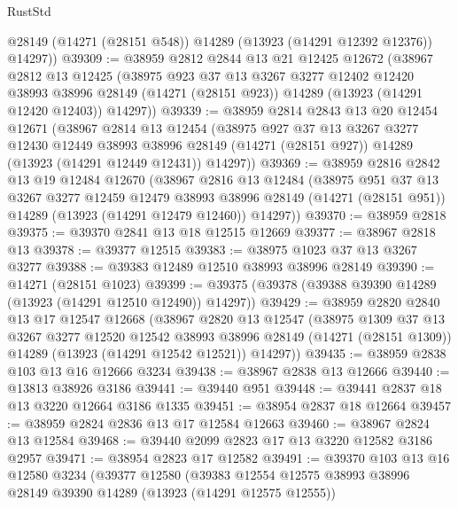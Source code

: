 \begin{lexlean}{RustStd}
\begin{coremodule}
        @28149
        (@14271 (@28151 @548))
        @14289
        (@13923 (@14291 @12392 @12376))
        @14297))
@39309 := @38959
    @2812
    @2844
    @13
    @21
    @12425
    @12672
    (@38967
      @2812
      @13
      @12425
      (@38975
        @923
        @37
        @13
        @3267
        @3277
        @12402
        @12420
        @38993
        @38996
        @28149
        (@14271 (@28151 @923))
        @14289
        (@13923 (@14291 @12420 @12403))
        @14297))
@39339 := @38959
    @2814
    @2843
    @13
    @20
    @12454
    @12671
    (@38967
      @2814
      @13
      @12454
      (@38975
        @927
        @37
        @13
        @3267
        @3277
        @12430
        @12449
        @38993
        @38996
        @28149
        (@14271 (@28151 @927))
        @14289
        (@13923 (@14291 @12449 @12431))
        @14297))
@39369 := @38959
    @2816
    @2842
    @13
    @19
    @12484
    @12670
    (@38967
      @2816
      @13
      @12484
      (@38975
        @951
        @37
        @13
        @3267
        @3277
        @12459
        @12479
        @38993
        @38996
        @28149
        (@14271 (@28151 @951))
        @14289
        (@13923 (@14291 @12479 @12460))
        @14297))
@39370 := @38959 @2818
@39375 := @39370 @2841 @13 @18 @12515 @12669
@39377 := @38967 @2818 @13
@39378 := @39377 @12515
@39383 := @38975 @1023 @37 @13 @3267 @3277
@39388 := @39383 @12489 @12510 @38993 @38996 @28149
@39390 := @14271 (@28151 @1023)
@39399 := @39375 (@39378 (@39388 @39390 @14289 (@13923 (@14291 @12510 @12490)) @14297))
@39429 := @38959
    @2820
    @2840
    @13
    @17
    @12547
    @12668
    (@38967
      @2820
      @13
      @12547
      (@38975
        @1309
        @37
        @13
        @3267
        @3277
        @12520
        @12542
        @38993
        @38996
        @28149
        (@14271 (@28151 @1309))
        @14289
        (@13923 (@14291 @12542 @12521))
        @14297))
@39435 := @38959 @2838 @103 @13 @16 @12666 @3234
@39438 := @38967 @2838 @13 @12666
@39440 := @13813 @38926 @3186
@39441 := @39440 @951
@39448 := @39441 @2837 @18 @13 @3220 @12664 @3186 @1335
@39451 := @38954 @2837 @18 @12664
@39457 := @38959 @2824 @2836 @13 @17 @12584 @12663
@39460 := @38967 @2824 @13 @12584
@39468 := @39440 @2099 @2823 @17 @13 @3220 @12582 @3186 @2957
@39471 := @38954 @2823 @17 @12582
@39491 := @39370
    @103
    @13
    @16
    @12580
    @3234
    (@39377
      @12580
      (@39383
        @12554
        @12575
        @38993
        @38996
        @28149
        @39390
        @14289
        (@13923 (@14291 @12575 @12555))

\end{coremodule}
\end{lexlean}
